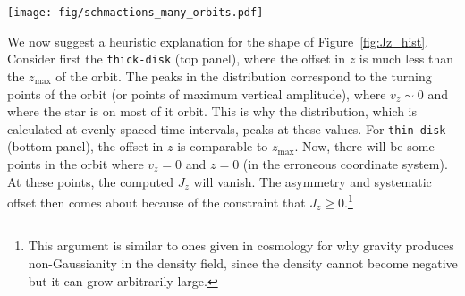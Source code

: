 \documentclass[twocolumn]{aastex62}
\newcommand{\thin}{\texttt{thin-disk}}
\newcommand{\thick}{\texttt{thick-disk}}
\newcommand{\halo}{\texttt{halo}}
\begin{document}
\begin{figure*}[htb!]
\begin{center}
\texttt{[image: fig/schmactions\_many\_orbits.pdf]}
\end{center}
\caption{We report the fractional error in each action $J_i$ induced by
coordinate system offsets for \thin{}, \thick{}, and \halo{}
(Table~\ref{tab:orbits}). The error ($\Delta J_i$) is computed as one half the
95th minus 5th percentile of the distribution of computed action values. See
discussion in the text and Figure~\ref{fig:Jz_hist} for the justification in
using this to measure the magnitude of the induced error. The left, center,
and right panels show the result for $J_R$, $J_{\phi}$, and $J_z$,
respectively. The upper panels consider an offset in $z$ and the lower panels
consider an offset in $x$ (equivalently, an offset in the solar radius). In
some panels, we also plot as dashed lines the epicyclic prediction of the
induced action error (Equation~\eqref{eq:Ji_err_mosttime}). In the epicyclic
approximation, a $z$ offset only induces an error in $J_z$\,---\,for all three
orbits the epicyclic approximation is a good description of the $J_z$ error.
An $x$ offset induces an error in $J_R$ and $J_{\phi}$. The error in $J_R$ is
somewhat well-described for \thin{} and \thick{}, and a poor description for
\halo{}. For $J_{\phi}$, the epicyclic approximation is not a good description
for any orbit.}
\label{fig:many_orbit_wrong_ref}
\end{figure*}

We now suggest a heuristic explanation for the shape of
Figure~\ref{fig:Jz_hist}. Consider first the \thick{} (top panel), where the
offset in $z$ is much less than the $z_{\text{max}}$ of the orbit. The peaks
in the distribution correspond to the turning points of the orbit (or points
of maximum vertical amplitude), where $v_z \sim 0$ and where the star is on
most of it orbit. This is why the distribution, which is calculated at evenly
spaced time intervals, peaks at these values. For \thin{} (bottom panel), the
offset in $z$ is comparable to $z_{\text{max}}$. Now, there will be some
points in the orbit where $v_z = 0$ and $z=0$ (in the erroneous coordinate
system). At these points, the computed $J_z$ will vanish. The asymmetry and
systematic offset then comes about because of the constraint that $J_z \geq
0$.\footnote{This argument is similar to ones given in cosmology for why
gravity produces non-Gaussianity in the density field, since the density
cannot become negative but it can grow arbitrarily large.}
\end{document}
